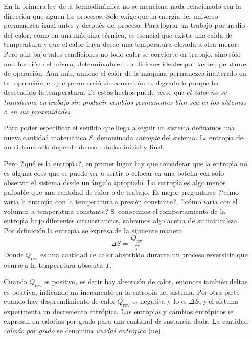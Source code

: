  En la primera ley de la termodin\'amica no se menciona nada relacionado con la direcci\'on que siguen los procesos. S\'olo exige que la energ\'{\i}a del universo permanezca igual antes y  despu\'es del proceso. Para lograr un trabajo por medio del calor, como en una m\'aquina t\'ermica, es esencial que exista una ca\'{\i}da de temperatura y que el calor fluya desde una tempe\-ratura elevada a otra menor. Pero a\'un bajo tales condiciones no todo calor se convierte en trabajo, sino s\'olo una fracci\'on del mismo, determinado en condiciones ideales por las temperaturas de operaci\'on. A\'un m\'as, aunque el calor de la m\'aquina permanezca inalterado en tal operaci\'on, el que permaneci\'o sin conversi\'on es degradado porque ha descendido la temperatura. De estos hechos puede verse que \textit{el calor no se transforma en trabajo sin producir cambios permanentes bien sea en los sistemas o en sus proximidades.}

Para poder especificar el sentido que llega a seguir un sistema definamos una nueva cantidad matem\'atica $S$, denominada \textit{\gls{entropia}} del sistema. La entrop\'{\i}a  de un sistema s\'olo depende de sus estados inicial y final.

Pero ?`qu\'e es la entrop\'{\i}a?, en primer lugar hay que considerar que la entrop\'{\i}a no es alguna cosa que se puede ver o sentir o colocar en una botella con s\'olo observar el sistema desde un \'angulo apropiado. La entrop\'{\i}a es algo menos palpable que una cantidad de calor o de trabajo. Es mejor preguntarse ?`c\'omo varia la entrop\'{\i}a con la temperatura a presi\'on constante?, ?`c\'omo varia con el volumen a temperatura constante? Si conocemos el comportamiento de la entrop\'{\i}a bajo diferentes circunstancias, sabremos algo acerca de su naturaleza.
Por definici\'on la entrop\'{\i}a se expresa de la siguiente manera:
   \begin{equation}
   \Delta S = \frac{Q _{\mathrm{rev}}}{T}
   \end{equation}
Donde $Q _{\mathrm{rev}}$ es una cantidad de calor absorbido durante un proceso reversible que ocurre a
la temperatura absoluta  $T$.

Cuando $Q _{\mathrm{rev}}$ es positivo, es decir hay absorci\'on de calor, entonces tambi\'en \gls{deltas} es positiva, indicando un incremento en la entrop\'{\i}a del sistema. Por otra parte cuando hay desprendimiento de calor  $Q _{\mathrm{rev}}$ es negativa y lo es $\Delta S$, y el
sistema experimenta un decremento entr\'opico. Las entrop\'{\i}as y cambios entr\'opicos se expresan en  calor\'{\i}as por grado para una cantidad de sustancia dada. La cantidad \textit{calor\'{\i}a por grado} se denomina \textit{unidad
entr\'opica} (ue).

